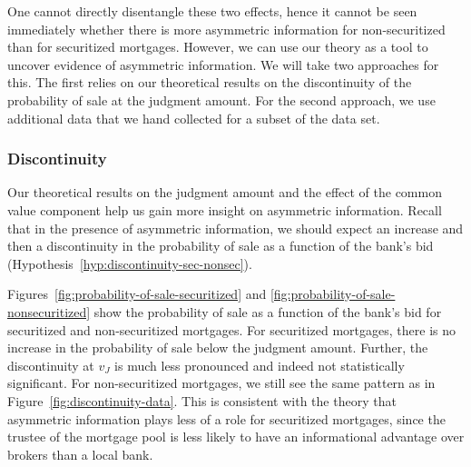 \documentclass[11pt,twopage]{article}
\begin{document}
One cannot directly disentangle these two effects, hence it cannot be
seen immediately whether there is more asymmetric information for
non-securitized than for securitized mortgages. However, we can use
our theory as a tool to uncover evidence of asymmetric information. We
will take two approaches for this. The first relies on our theoretical
results on the discontinuity of the probability of sale at the judgment amount. For the second
approach, we use additional data that we hand collected for a subset
of the data set.

\subsubsection{Discontinuity}


Our theoretical results on the judgment amount and the effect of the
common value component help us gain more insight on asymmetric
information. Recall that in the presence of asymmetric information, we
should expect an increase and then a discontinuity in the probability of sale as a function
of the bank's bid (Hypothesis~\ref{hyp:discontinuity-sec-nonsec}).

Figures~\ref{fig:probability-of-sale-securitized} and
\ref{fig:probability-of-sale-nonsecuritized} show the probability of
sale as a function of the bank's bid for securitized
and non-securitized mortgages. For securitized mortgages, there is no increase in the probability of sale below the judgment amount. Further, the discontinuity at $v_J$ is much less pronounced and indeed not statistically significant. For non-securitized mortgages, we still see the same pattern as in Figure~\ref{fig:discontinuity-data}. This is consistent
with the theory that asymmetric information plays less of a role for
securitized mortgages, since the trustee of the mortgage pool is less
likely to have an informational advantage over brokers than a local
bank.
\end{document}
